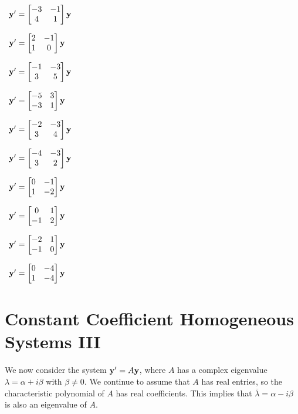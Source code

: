 \begin{exerciselistTwoColumn}
\item\label{exer:10.5.36}\CGex\, $\mathbf{y}'=\begin{bmatrix}-3&-1\\4&1\end{bmatrix}\mathbf{y}$
\item\label{exer:10.5.37}\CGex\,  $\mathbf{y}'=\begin{bmatrix}2&-1\\1&0\end{bmatrix}\mathbf{y}$
\item\label{exer:10.5.38}\CGex\, $\mathbf{y}'=\begin{bmatrix}-1&-3\\3&5\end{bmatrix}\mathbf{y}$
\item\label{exer:10.5.39}\CGex\,  $\mathbf{y}'=\begin{bmatrix}-5&3\\-3&1\end{bmatrix}\mathbf{y}$
\item\label{exer:10.5.40}\CGex\,  $\mathbf{y}'=\begin{bmatrix}-2&-3\\3&4\end{bmatrix}\mathbf{y}$
\item\label{exer:10.5.41}\CGex\,  $\mathbf{y}'=\begin{bmatrix}-4&-3\\3&2\end{bmatrix}\mathbf{y}$
\item\label{exer:10.5.42}\CGex\,  $\mathbf{y}'=\begin{bmatrix}0&-1\\1&-2\end{bmatrix}\mathbf{y}$
\item\label{exer:10.5.43}\CGex\,  $\mathbf{y}'=\begin{bmatrix}0&1\\-1&2\end{bmatrix}\mathbf{y}$
\item\label{exer:10.5.44}\CGex\,  $\mathbf{y}'=\begin{bmatrix}-2&1\\-1&0\end{bmatrix}\mathbf{y}$
\item\label{exer:10.5.45}\CGex\, $\mathbf{y}'=\begin{bmatrix}0&-4\\1&-4\end{bmatrix}\mathbf{y}$
\end{exerciselistTwoColumn}


\section{Constant Coefficient Homogeneous Systems III}
\label{sec:system_const_coeff_iii}

We now consider the system $\mathbf{y}'=A\mathbf{y}$, where $A$ has a complex
eigenvalue $\lambda=\alpha+i\beta$ with $\beta\ne0$. We continue to
assume that $A$ has real entries, so the characteristic polynomial of
$A$ has real coefficients. This implies that
$\overline\lambda=\alpha-i\beta$ is also an eigenvalue of $A$.

